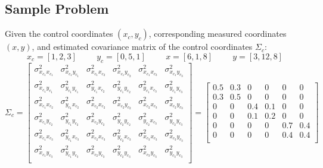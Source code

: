 \subsection{Sample Problem}
Given the control coordinates $(x_c,y_c)$, corresponding measured coordinates $(x,y)$, and estimated covariance matrix of the control coordinates $\Sigma_c$: 
\[
x_c = [1,2,3] \hspace{1cm} y_c = [0, 5, 1]  \hspace{1cm} x = [6,1,8] \hspace{1cm} y = [3,12,8]
\]
\[
\Sigma_c = 
 \begin{bmatrix}
\sigma_{x_{c_1}x_{c_1}}^2 & \sigma_{x_{c_1}y_{c_1}}^2 & \sigma_{x_{c_1}x_{c_2}}^2 & \sigma_{x_{c_1}y_{c_2}}^2 & \sigma_{x_{c_1}x_{c_3}}^2 & \sigma_{x_{c_1}y_{c_3}}^2  \\ 
\sigma_{x_{c_1}y_{c_1}}^2 & \sigma_{y_{c_1}y_{c_1}}^2 & \sigma_{y_{c_1}x_{c_2}}^2 & \sigma_{y_{c_1}y_{c_2}}^2 & \sigma_{y_{c_1}x_{c_3}}^2 & \sigma_{y_{c_1}y_{c_3}}^2  \\ 
\sigma_{x_{c_1}x_{c_2}}^2 & \sigma_{y_{c_1}x_{c_2}}^2 & \sigma_{x_{c_2}x_{c_2}}^2 & \sigma_{x_{c_2}y_{c_2}}^2 & \sigma_{x_{c_2}x_{c_3}}^2 & \sigma_{x_{c_2}y_{c_3}}^2  \\ 
\sigma_{x_{c_1}y_{c_2}}^2 & \sigma_{y_{c_1}y_{c_2}}^2 & \sigma_{x_{c_2}y_{c_2}}^2 & \sigma_{y_{c_2}y_{c_2}}^2 & \sigma_{y_{c_2}x_{c_3}}^2 & \sigma_{y_{c_2}y_{c_3}}^2  \\ 
\sigma_{x_{c_1}x_{c_3}}^2 & \sigma_{y_{c_1}x_{c_3}}^2 & \sigma_{x_{c_2}x_{c_3}}^2 & \sigma_{y_{c_2}x_{c_3}}^2 & \sigma_{x_{c_3}x_{c_3}}^2 & \sigma_{x_{c_3}y_{c_3}}^2  \\ 
\sigma_{x_{c_1}y_{c_3}}^2 & \sigma_{y_{c_1}y_{c_3}}^2 & \sigma_{x_{c_2}y_{c_3}}^2 & \sigma_{y_{c_2}y_{c_3}}^2 & \sigma_{x_{c_3}y_{c_3}}^2 & \sigma_{y_{c_3}y_{c_3}}^2  \\ 
 \end{bmatrix}
 = 
 \begin{bmatrix}
 0.5 & 0.3 & 0 & 0 & 0 & 0 \\
 0.3 & 0.5 & 0 & 0 & 0 & 0 \\
 0 & 0 & 0.4 & 0.1 & 0 & 0 \\
 0 & 0 & 0.1 & 0.2 & 0 & 0 \\
 0 & 0 & 0 & 0 & 0.7 & 0.4 \\
 0 & 0 & 0 & 0 & 0.4 & 0.4 \\
 \end{bmatrix} 
\]

